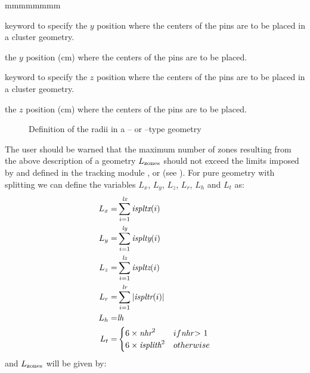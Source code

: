 \begin{ListeDeDescription}{mmmmmmmm}
\item[\moc{CPINY}] keyword to specify the $y$ position where the centers of the pins are
to be placed in a cluster geometry. 

\item[\dusa{ypins}] the $y$ position (cm) where the centers of the pins are to be
placed.

\item[\moc{CPINZ}] keyword to specify the $z$ position where the centers of the pins are
to be placed in a cluster geometry. 

\item[\dusa{zpins}] the $z$ position (cm) where the centers of the pins are to be
placed.

\end{ListeDeDescription}

\begin{figure}[!]  
\begin{center} 
\epsfxsize=6cm
\centerline{ }
\parbox{16cm}{\caption{Definition of the radii in a -- or
--type geometry}\label{fig:radius}}    
\end{center}  
\end{figure}

The user should be warned that the maximum number of zones resulting from the above description of a geometry $L_{\rm{zones}}$ should not exceed the limits imposed by
 and defined in the tracking module ,  or
 (see ). For pure geometry with splitting we can define the variables $L_x$, $L_y$, $L_z$, $L_r$, $L_h$ and $L_{t}$ as:
  \begin{align*}
  L_x=&\sum_{i=1}^{\textit{lx}} \textit{ispltx}(i) \\ 
  L_y=&\sum_{i=1}^{\textit{ly}} \textit{isplty}(i) \\ 
  L_z=&\sum_{i=1}^{\textit{lz}} \textit{ispltz}(i) \\ 
  L_r=&\sum_{i=1}^{\textit{lr}} |\textit{ispltr}(i)| \\
  L_h=&\textit{lh} \\
  L_t=&\begin{cases}
  6\times\textit{nhr}^{2} &if $\textit{nhr}> 1$\\
  6\times\textit{isplith}^{2} &otherwise  \\ \end{cases}
  \end{align*}
and $L_{\rm{zones}}$ will be given by:

